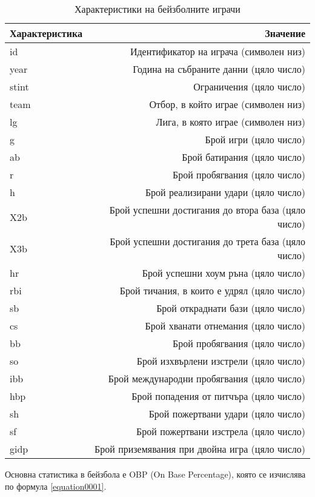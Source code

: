 \begin{table}[h!]
\centering
\begin{tabular}{|l|r|} 
  \rowcolor{lightgray}
  \hline
  Характеристика & Значение \\ [0.1ex] 
  \hline\hline
  id & Идентификатор на играча (символен низ) \\
  \hline
  year & Година на събраните данни (цяло число) \\
  \hline
  stint & Ограничения (цяло число) \\
  \hline
  team & Отбор, в който играе (символен низ) \\
  \hline
  lg & Лига, в която играе (символен низ) \\
  \hline
  g & Брой игри (цяло число) \\
  \hline
  ab & Брой батирания (цяло число) \\
  \hline
  r & Брой пробягвания (цяло число) \\
  \hline
  h & Брой реализирани удари (цяло число) \\
  \hline
  X2b & Брой успешни достигания до втора база (цяло число) \\
  \hline
  X3b & Брой успешни достигания до трета база (цяло число) \\
  \hline
  hr & Брой успешни хоум ръна (цяло число) \\
  \hline
  rbi & Брой тичания, в които е удрял (цяло число) \\
  \hline
  sb & Брой откраднати бази (цяло число) \\
  \hline
  cs & Брой хванати отнемания (цяло число) \\
  \hline
  bb & Брой пробягвания (цяло число) \\
  \hline
  so & Брой изхвърлени изстрели (цяло число) \\
  \hline
  ibb & Брой международни пробягвания (цяло число) \\
  \hline
  hbp & Брой попадения от питчъра (цяло число) \\
  \hline
  sh & Брой пожертвани удари (цяло число) \\
  \hline
  sf & Брой пожертвани изстрела (цяло число) \\
  \hline
  gidp & Брой приземявания при двойна игра (цяло число) \\
  \hline
\end{tabular}
\caption{Характеристики на бейзболните играчи}
\label{table0003}
\end{table}

Основна статистика в бейзбола е OBP (On Base Percentage), която се изчислява по формула \ref{equation0001}.

